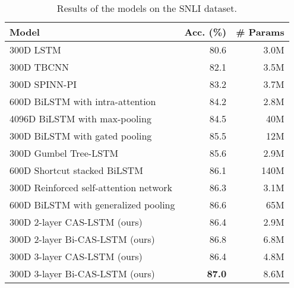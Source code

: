 \documentclass[wcp]{jmlr}
\begin{document}
    \begin{table*}[t]
        \centering
        \begin{tabular}{l r r}
            \hline
            \bf{Model} & \bf{Acc. (\%)} & \bf {\# Params} \\
            \hline
            300D LSTM \citep{bowman2016spinn} & 80.6 & 3.0M \\
            300D TBCNN \citep{mou2016snli} & 82.1 & 3.5M \\
            300D SPINN-PI \citep{bowman2016spinn} & 83.2 & 3.7M \\
            600D BiLSTM with intra-attention \citep{liu2016learning} & 84.2 & 2.8M \\
            4096D BiLSTM with max-pooling \citep{conneau2017infersent} & 84.5 & 40M \\
            300D BiLSTM with gated pooling \citep{chen2017gated} & 85.5 & 12M \\
            300D Gumbel Tree-LSTM \citep{choi2018learning} & 85.6 & 2.9M \\
            600D Shortcut stacked BiLSTM \citep{nie2017shortcut} & 86.1 & 140M \\
            300D Reinforced self-attention network \citep{shen2018reinforced} & 86.3 & 3.1M \\
            600D BiLSTM with generalized pooling \citep{chen2018generalized} & 86.6 & 65M \\
            \hline
            300D 2-layer CAS-LSTM (ours) & 86.4 & 2.9M \\
            300D 2-layer Bi-CAS-LSTM (ours) & {86.8} & 6.8M \\
            300D 3-layer CAS-LSTM (ours) & 86.4 & 4.8M  \\
            300D 3-layer Bi-CAS-LSTM (ours) & \bf{87.0} & 8.6M \\
            \hline
        \end{tabular}
        \caption{Results of the models on the SNLI dataset.}
        \label{table:snli}
    \end{table*}
    
\end{document}
